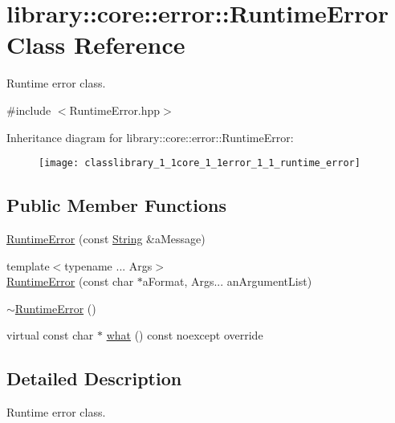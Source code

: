 \hypertarget{classlibrary_1_1core_1_1error_1_1_runtime_error}{}\section{library\+:\+:core\+:\+:error\+:\+:Runtime\+Error Class Reference}
\label{classlibrary_1_1core_1_1error_1_1_runtime_error}


Runtime error class.  




{\ttfamily \#include $<$Runtime\+Error.\+hpp$>$}

Inheritance diagram for library\+:\+:core\+:\+:error\+:\+:Runtime\+Error\+:\begin{figure}[H]
\begin{center}
\leavevmode
\texttt{[image: classlibrary\_1\_1core\_1\_1error\_1\_1\_runtime\_error]}
\end{center}
\end{figure}
\subsection*{Public Member Functions}
\begin{DoxyCompactItemize}
\item 
\hyperlink{classlibrary_1_1core_1_1error_1_1_runtime_error_a6ba0ac577d200ad5f83843ecbe775c2f}{Runtime\+Error} (const \hyperlink{classlibrary_1_1core_1_1types_1_1_string}{String} \&a\+Message)
\item 
{\footnotesize template$<$typename ... Args$>$ }\\\hyperlink{classlibrary_1_1core_1_1error_1_1_runtime_error_a4ac1bac63f4c46fe10e7c96d545c6e4a}{Runtime\+Error} (const char $\ast$a\+Format, Args... an\+Argument\+List)
\item 
\hyperlink{classlibrary_1_1core_1_1error_1_1_runtime_error_ab66a0df8767bf53b9910a15960622c0d}{$\sim$\+Runtime\+Error} ()
\item 
virtual const char $\ast$ \hyperlink{classlibrary_1_1core_1_1error_1_1_runtime_error_af3da31cf67f3f5e120c5db9072e3a801}{what} () const noexcept override
\end{DoxyCompactItemize}


\subsection{Detailed Description}
Runtime error class. 


